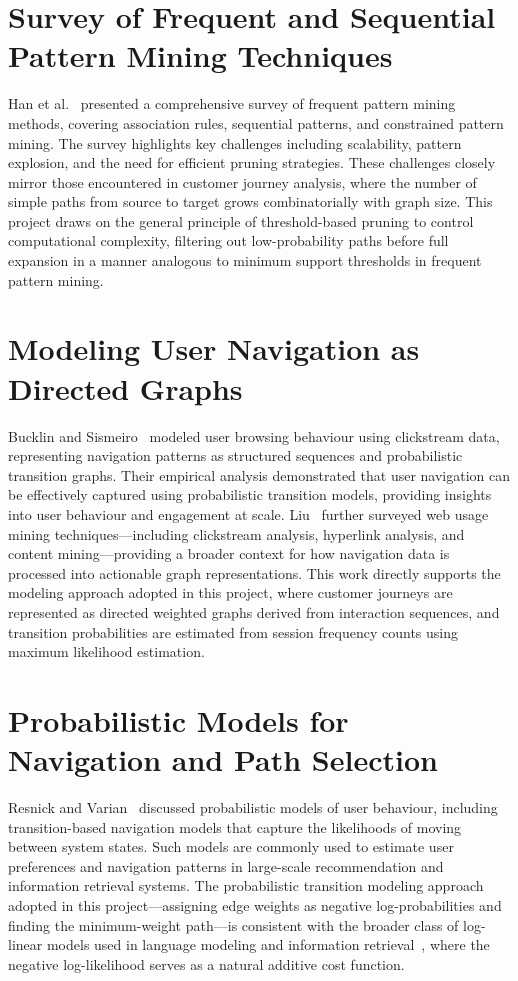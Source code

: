 \section{Survey of Frequent and Sequential Pattern Mining Techniques}

Han et al.~\citep{han2007sequential} presented a comprehensive survey of frequent pattern mining methods, covering association rules, sequential patterns, and constrained pattern mining. The survey highlights key challenges including scalability, pattern explosion, and the need for efficient pruning strategies. These challenges closely mirror those encountered in customer journey analysis, where the number of simple paths from source to target grows combinatorially with graph size. This project draws on the general principle of threshold-based pruning to control computational complexity, filtering out low-probability paths before full expansion in a manner analogous to minimum support thresholds in frequent pattern mining.

\section{Modeling User Navigation as Directed Graphs}

Bucklin and Sismeiro~\citep{bucklin2003clickstream} modeled user browsing behaviour using clickstream data, representing navigation patterns as structured sequences and probabilistic transition graphs. Their empirical analysis demonstrated that user navigation can be effectively captured using probabilistic transition models, providing insights into user behaviour and engagement at scale. Liu~\citep{liu2011webmining} further surveyed web usage mining techniques---including clickstream analysis, hyperlink analysis, and content mining---providing a broader context for how navigation data is processed into actionable graph representations. This work directly supports the modeling approach adopted in this project, where customer journeys are represented as directed weighted graphs derived from interaction sequences, and transition probabilities are estimated from session frequency counts using maximum likelihood estimation.

\section{Probabilistic Models for Navigation and Path Selection}

Resnick and Varian~\citep{resnick1997recommender} discussed probabilistic models of user behaviour, including transition-based navigation models that capture the likelihoods of moving between system states. Such models are commonly used to estimate user preferences and navigation patterns in large-scale recommendation and information retrieval systems. The probabilistic transition modeling approach adopted in this project---assigning edge weights as negative log-probabilities and finding the minimum-weight path---is consistent with the broader class of log-linear models used in language modeling and information retrieval~\citep{manning2008nlp,manning2008ir}, where the negative log-likelihood serves as a natural additive cost function.

